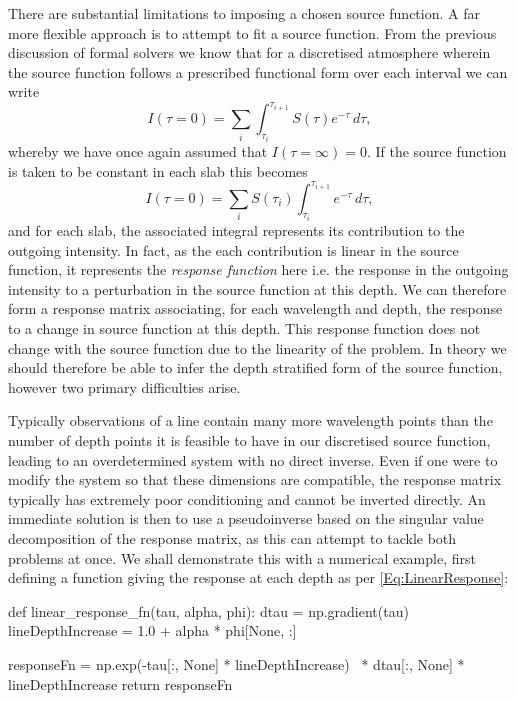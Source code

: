There are substantial limitations to imposing a chosen source function.
A far more flexible approach is to attempt to fit a source function.
From the previous discussion of formal solvers we know that for a discretised atmosphere wherein the source function follows a prescribed functional form over each interval we can write
\begin{equation}
    I(\tau=0) = \sum_i \int_{\tau_i}^{\tau_{i+1}} S(\tau)e^{-\tau}\, d\tau,
\end{equation}
whereby we have once again assumed that $I(\tau=\infty)=0$.
If the source function is taken to be constant in each slab this becomes
\begin{equation}\label{Eq:LinearResponse}
    I(\tau=0) = \sum_i S(\tau_i) \int_{\tau_i}^{\tau_{i+1}} e^{-\tau}\, d\tau,
\end{equation}
and for each slab, the associated integral represents its contribution to the outgoing intensity. In fact, as the each contribution is linear in the source function, it represents the \emph{response function} here i.e. the response in the outgoing intensity to a perturbation in the source function at this depth.
We can therefore form a response matrix associating, for each wavelength and depth, the response to a change in source function at this depth.
This response function does not change with the source function due to the linearity of the problem.
In theory we should therefore be able to infer the depth stratified form of the source function, however two primary difficulties arise.

Typically observations of a line contain many more wavelength points than the number of depth points it is feasible to have in our discretised source function, leading to an overdetermined system with no direct inverse.
Even if one were to modify the system so that these dimensions are compatible, the response matrix typically has extremely poor conditioning and cannot be inverted directly.
An immediate solution is then to use a pseudoinverse based on the singular value decomposition of the response matrix, as this can attempt to tackle both problems at once.
We shall demonstrate this with a numerical example, first defining a function giving the response at each depth as per \eqref{Eq:LinearResponse}:

\begin{pyblock}[Radynversion]
def linear_response_fn(tau, alpha, phi):
    dtau = np.gradient(tau)
    lineDepthIncrease = 1.0 + alpha * phi[None, :]

    responseFn = np.exp(-tau[:, None] * lineDepthIncrease) \
                  * dtau[:, None] * lineDepthIncrease
    return responseFn
\end{pyblock}


